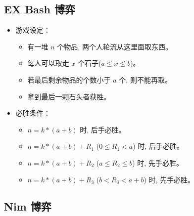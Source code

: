 \documentclass[a4paper,12pt]{article}
\begin{document}
\subsection{EX Bash 博弈}

\begin{itemize}
    \item 游戏设定：
    \begin{itemize}
        \item 有一堆 $n$ 个物品, 两个人轮流从这里面取东西。
        \item 每人可以取走 $x$ 个石子($a \leq x \leq b$)。
        \item 若最后剩余物品的个数小于 $a$ 个, 则不能再取。
        \item 拿到最后一颗石头者获胜。
    \end{itemize}
    
    \item 必胜条件：
    \begin{itemize}
        \item $n = k * (a + b)$ 时, 后手必胜。
        \item $n = k * (a + b) + R_1$ ($0 \leq R_1 < a$) 时, 后手必胜。
        \item $n = k * (a + b) + R_2$ ($a \leq R_2 \leq b$) 时, 先手必胜。
        \item $n = k * (a + b) + R_3$ ($b < R_3 < a + b$) 时, 先手必胜。
    \end{itemize}
\end{itemize}

\subsection{Nim 博弈}
\end{document}
